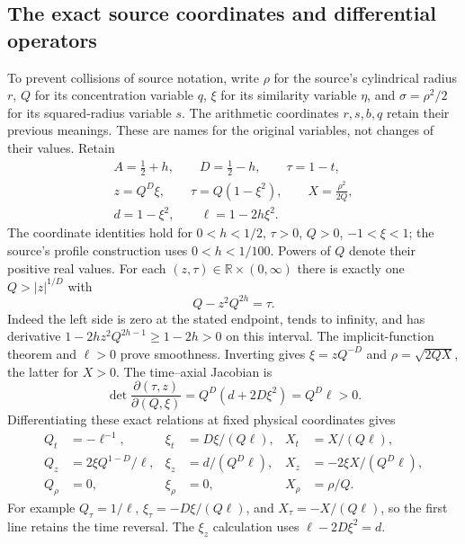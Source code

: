 \subsection{The exact source coordinates and differential operators}
To prevent collisions of source notation, write $\rho$ for the source's
cylindrical radius $r$, $Q$ for its concentration variable $q$, $\xi$
for its similarity variable $\eta$, and $\sigma=\rho^2/2$ for its
squared-radius variable $s$. The arithmetic coordinates $r,s,b,q$ retain
their previous meanings. These are names for the original variables,
not changes of their values. Retain
\begin{gather*}
 A=\tfrac12+h,\qquad D=\tfrac12-h,\qquad \tau=1-t,\\
 z=Q^D\xi,\qquad \tau=Q(1-\xi^2),\qquad X=\frac{\rho^2}{2Q},\\
 d=1-\xi^2,\qquad \ell=1-2h\xi^2.
\end{gather*}
The coordinate identities hold for $0<h<1/2$, $\tau>0$,
$Q>0$, $-1<\xi<1$; the source's profile construction uses
$0<h<1/100$. Powers of $Q$ denote their positive real values.
For each $(z,\tau)\in\mathbb R\times(0,\infty)$ there is exactly one
$Q>|z|^{1/D}$ with
\[
 Q-z^2Q^{2h}=\tau.
\]
Indeed the left side is zero at the stated endpoint, tends to infinity,
and has derivative $1-2hz^2Q^{2h-1}\geq1-2h>0$ on this interval.
The implicit-function theorem and $\ell>0$ prove smoothness. Inverting
gives $\xi=zQ^{-D}$ and $\rho=\sqrt{2QX}$, the latter for $X>0$.
The time--axial Jacobian is
\[
 \det\frac{\partial(\tau,z)}{\partial(Q,\xi)}
 =Q^D(d+2D\xi^2)=Q^D\ell>0.
\]
Differentiating these exact relations at fixed physical coordinates gives
\begin{align*}
 Q_t&=-\ell^{-1},& \xi_t&=D\xi/(Q\ell),& X_t&=X/(Q\ell),\\
 Q_z&=2\xi Q^{1-D}/\ell,&
 \xi_z&=d/(Q^D\ell),& X_z&=-2\xi X/(Q^D\ell),\\
 Q_\rho&=0,&\xi_\rho&=0,&X_\rho&=\rho/Q.
\end{align*}
For example $Q_\tau=1/\ell$, $\xi_\tau=-D\xi/(Q\ell)$,
and $X_\tau=-X/(Q\ell)$, so the first line retains the time reversal.
The $\xi_z$ calculation uses $\ell-2D\xi^2=d$.

